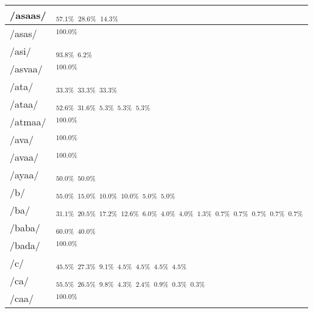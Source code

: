 \documentclass{article}
\begin{document}
\begin{longtable}{|l|p{}|}
/asaas/ & \textIndus{}$_{57.1\%}$ \quad \textIndus{}$_{28.6\%}$ \quad \textIndus{}$_{14.3\%}$ \\ \hline
/asas/ & \textIndus{}$_{100.0\%}$ \\ \hline
/asi/ & \textIndus{}$_{93.8\%}$ \quad \textIndus{}$_{6.2\%}$ \\ \hline
/asvaa/ & \textIndus{}$_{100.0\%}$ \\ \hline
/ata/ & \textIndus{}$_{33.3\%}$ \quad \textIndus{}$_{33.3\%}$ \quad \textIndus{}$_{33.3\%}$ \\ \hline
/ataa/ & \textIndus{}$_{52.6\%}$ \quad \textIndus{}$_{31.6\%}$ \quad \textIndus{}$_{5.3\%}$ \quad \textIndus{}$_{5.3\%}$ \quad \textIndus{}$_{5.3\%}$ \\ \hline
/atmaa/ & \textIndus{}$_{100.0\%}$ \\ \hline
/ava/ & \textIndus{}$_{100.0\%}$ \\ \hline
/avaa/ & \textIndus{}$_{100.0\%}$ \\ \hline
/ayaa/ & \textIndus{}$_{50.0\%}$ \quad \textIndus{}$_{50.0\%}$ \\ \hline
/b/ & \textIndus{}$_{55.0\%}$ \quad \textIndus{}$_{15.0\%}$ \quad \textIndus{}$_{10.0\%}$ \quad \textIndus{}$_{10.0\%}$ \quad \textIndus{}$_{5.0\%}$ \quad \textIndus{}$_{5.0\%}$ \\ \hline
/ba/ & \textIndus{}$_{31.1\%}$ \quad \textIndus{}$_{20.5\%}$ \quad \textIndus{}$_{17.2\%}$ \quad \textIndus{}$_{12.6\%}$ \quad \textIndus{}$_{6.0\%}$ \quad \textIndus{}$_{4.0\%}$ \quad \textIndus{}$_{4.0\%}$ \quad \textIndus{}$_{1.3\%}$ \quad \textIndus{}$_{0.7\%}$ \quad \textIndus{}$_{0.7\%}$ \quad \textIndus{}$_{0.7\%}$ \quad \textIndus{}$_{0.7\%}$ \quad \textIndus{}$_{0.7\%}$ \\ \hline
/baba/ & \textIndus{}$_{60.0\%}$ \quad \textIndus{}$_{40.0\%}$ \\ \hline
/bada/ & \textIndus{}$_{100.0\%}$ \\ \hline
/c/ & \textIndus{}$_{45.5\%}$ \quad \textIndus{}$_{27.3\%}$ \quad \textIndus{}$_{9.1\%}$ \quad \textIndus{}$_{4.5\%}$ \quad \textIndus{}$_{4.5\%}$ \quad \textIndus{}$_{4.5\%}$ \quad \textIndus{}$_{4.5\%}$ \\ \hline
/ca/ & \textIndus{}$_{55.5\%}$ \quad \textIndus{}$_{26.5\%}$ \quad \textIndus{}$_{9.8\%}$ \quad \textIndus{}$_{4.3\%}$ \quad \textIndus{}$_{2.4\%}$ \quad \textIndus{}$_{0.9\%}$ \quad \textIndus{}$_{0.3\%}$ \quad \textIndus{}$_{0.3\%}$ \\ \hline
/caa/ & \textIndus{}$_{100.0\%}$ \\ \hline

\end{longtable}
\end{document}

